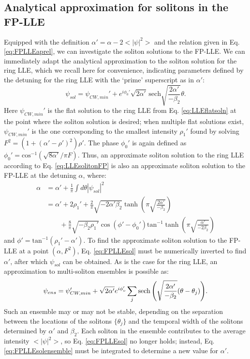 \subsection{Analytical approximation for solitons in the FP-LLE}
Equipped with the definition $\alpha'=\alpha-2<|\psi|^2>$ and the relation given in Eq. \ref{eq:FPLLEaprel}, we can investigate the soliton solutions to the FP-LLE. We can immediately adapt the analytical approximation to the soliton solution for the ring LLE, which we recall here for convenience, indicating parameters defined by the detuning for the ring LLE with the `prime' superscript as in $\alpha'$:
\begin{equation}
\psi_{sol}=\psi_{CW,min}'+e^{i\phi_0'}\sqrt{2\alpha'}\,\mathrm{sech}\sqrt{\frac{2\alpha'}{-\beta_2}}\theta. \label{eq:LLEsolitonFP}
\end{equation}
Here $\psi_{CW,min}'$ is the flat solution to the ring LLE from Eq. \ref{eq:LLEflatsoln} at the point where the soliton solution is desired; when multiple flat solutions exist, $\psi_{CW,min}'$ is the one corresponding to the smallest intensity $\rho_1'$ found by solving $F^2=(1+(\alpha'-\rho')^2)\rho'$. The phase $\phi_0'$ is again defined as $\phi_0'=\mathrm{cos}^{-1}(\sqrt{8\alpha'}/\pi F)$. Thus, an approximate soliton solution to the ring LLE according to Eq. \ref{eq:LLEsolitonFP} is also an approximate soliton solution to the FP-LLE at the detuning $\alpha$, where:
\begin{align}
\alpha&=\alpha'+\frac{1}{\pi}\int d\theta |\psi_{sol}|^2\\
&=\alpha'+2\rho_1'+\frac{2}{\pi}\sqrt{-2\alpha'\beta_2}\tanh{\left(\pi\sqrt{\frac{2\alpha'}{-\beta_2}}\right)}\label{eq:FPLLEsol}\\
&\quad\quad +\frac{8}{\pi}\sqrt{-\beta_2 \rho_1'}\cos(\phi'-\phi_0')\mathrm{tan}^{-1}\tanh{\left(\pi\sqrt{\frac{\alpha'}{-2\beta_2}}\right)}\nonumber
\end{align}
and $\phi'=\mathrm{tan}^{-1}(\rho_1'-\alpha')$. To find the approximate soliton solution to the FP-LLE at a point $(\alpha,F^2)$, Eq. \ref{eq:FPLLEsol} must be numerically inverted to find $\alpha'$, after which $\psi_{sol}$ can be obtained. As is the case for the ring LLE, an approximation to multi-soliton ensembles is possible as:
\begin{equation}
\psi_{ens}=\psi_{CW,min}'+\sqrt{2\alpha^\prime}e^{i\phi_o^\prime}\sum_{j}\operatorname{sech}{\left(\sqrt{\frac{2\alpha^\prime}{-\beta_2}}(\theta-\theta_j)\right)}.\label{eq:FPLLEsolensemble}
\end{equation}
Such an ensemble may or may not be stable, depending on the separation between the locations of the solitons $\{\theta_j\}$ and the temporal width of the solitons determined by $\alpha'$ and $\beta_2$. Each soliton in the ensemble contributes to the average intensity $<|\psi|^2>$, so Eq. \ref{eq:FPLLEsol} no longer holds; instead, Eq. \ref{eq:FPLLEsolensemble} must be integrated to determine a new value for $\alpha'$. 

